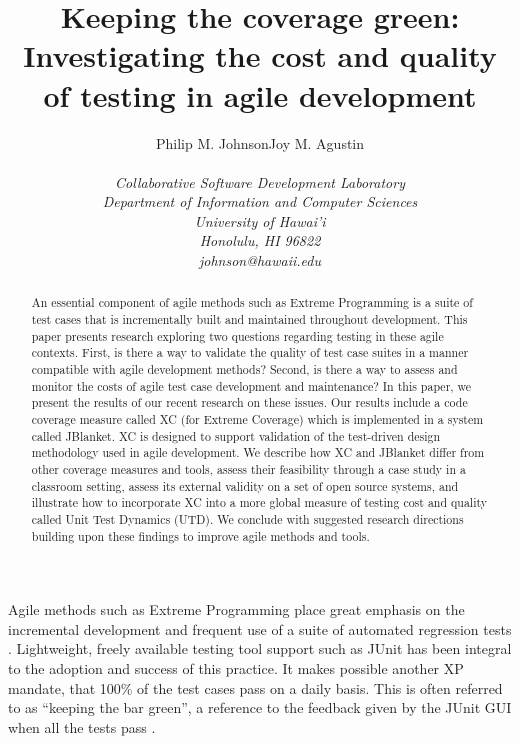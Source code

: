 \documentclass[10pt,twocolumn]{article}
\begin{document}
\title{Keeping the coverage green: \\ Investigating the cost and quality of 
testing in agile development}

\author{\protect\begin{tabular}{cccc}
Philip M. Johnson & Joy M. Agustin  \\
\end{tabular}\\
\em  Collaborative Software Development Laboratory \\
\em  Department of Information and Computer Sciences \\
\em  University of Hawai'i \\
\em  Honolulu, HI 96822 \\
\em  johnson@hawaii.edu}
\maketitle

\thispagestyle{empty}

\begin{abstract}
  An essential component of agile methods such as Extreme Programming is a
  suite of test cases that is incrementally built and maintained throughout
  development.  This paper presents research exploring two questions
  regarding testing in these agile contexts. First, is there a way to
  validate the quality of test case suites in a manner compatible with
  agile development methods?  Second, is there a way to assess and monitor
  the costs of agile test case development and maintenance?  In this paper,
  we present the results of our recent research on these issues. Our
  results include a code coverage measure called XC (for Extreme Coverage) which is
  implemented in a system called JBlanket. XC is designed to support
  validation of the test-driven design methodology used in agile
  development. We describe how XC and JBlanket differ from other coverage
  measures and tools, assess their feasibility through a case study in a
  classroom setting, assess its external validity on a set of open source
  systems, and illustrate how to incorporate XC into a more global measure
  of testing cost and quality called Unit Test Dynamics (UTD). We conclude
  with suggested research directions building upon these findings to
  improve agile methods and tools. 
\end{abstract}


Agile methods such as Extreme Programming place great emphasis on the
incremental development and frequent use of a suite of automated regression
tests \cite{Beck:2001,Cockburn:2002}.  Lightweight, freely available
testing tool support such as JUnit has been integral to the adoption and
success of this practice. It makes possible another XP mandate, that 100\%
of the test cases pass on a daily basis. This is often referred to as
``keeping the bar green'', a reference to the feedback given by the JUnit
GUI when all the tests pass \cite{JUnit}.
\end{document}
